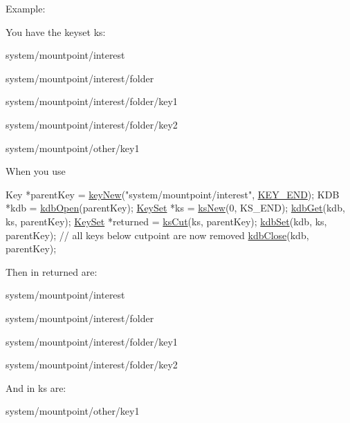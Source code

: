 \begin{DoxyParagraph}{Example\+:}

\end{DoxyParagraph}
You have the keyset {\ttfamily ks\+:} 
\begin{DoxyItemize}
\item {\ttfamily system/mountpoint/interest} 
\item {\ttfamily system/mountpoint/interest/folder} 
\item {\ttfamily system/mountpoint/interest/folder/key1} 
\item {\ttfamily system/mountpoint/interest/folder/key2} 
\item {\ttfamily system/mountpoint/other/key1} 
\end{DoxyItemize}

When you use 
\begin{DoxyCodeInclude}
        Key *parentKey = \hyperlink{group__key_gad23c65b44bf48d773759e1f9a4d43b89}{keyNew}(\textcolor{stringliteral}{"system/mountpoint/interest"}, \hyperlink{group__key_gga91fb3178848bd682000958089abbaf40aa8adb6fcb92dec58fb19410eacfdd403}{KEY\_END});
        KDB *kdb = \hyperlink{group__kdb_ga6808defe5870f328dd17910aacbdc6ca}{kdbOpen}(parentKey);
        \hyperlink{classkdb_1_1KeySet_a4eac9850fa4f06c07a5306befc3e4377}{KeySet} *ks = \hyperlink{group__keyset_ga671e1aaee3ae9dc13b4834a4ddbd2c3c}{ksNew}(0, KS\_END);
        \hyperlink{group__kdb_ga28e385fd9cb7ccfe0b2f1ed2f62453a1}{kdbGet}(kdb, ks, parentKey);
        \hyperlink{classkdb_1_1KeySet_a4eac9850fa4f06c07a5306befc3e4377}{KeySet} *returned = \hyperlink{group__keyset_ga6b00cf82b59af4d883a9bad6cf4a4a4a}{ksCut}(ks, parentKey);
        \hyperlink{group__kdb_ga11436b058408f83d303ca5e996832bcf}{kdbSet}(kdb, ks, parentKey); \textcolor{comment}{// all keys below cutpoint are now removed}
        \hyperlink{group__kdb_gadb54dc9fda17ee07deb9444df745c96f}{kdbClose}(kdb, parentKey);
\end{DoxyCodeInclude}
 Then in {\ttfamily returned} are\+:
\begin{DoxyItemize}
\item {\ttfamily system/mountpoint/interest} 
\item {\ttfamily system/mountpoint/interest/folder} 
\item {\ttfamily system/mountpoint/interest/folder/key1} 
\item {\ttfamily system/mountpoint/interest/folder/key2} 
\end{DoxyItemize}

And in {\ttfamily ks} are\+:
\begin{DoxyItemize}
\item {\ttfamily system/mountpoint/other/key1} 
\end{DoxyItemize}

